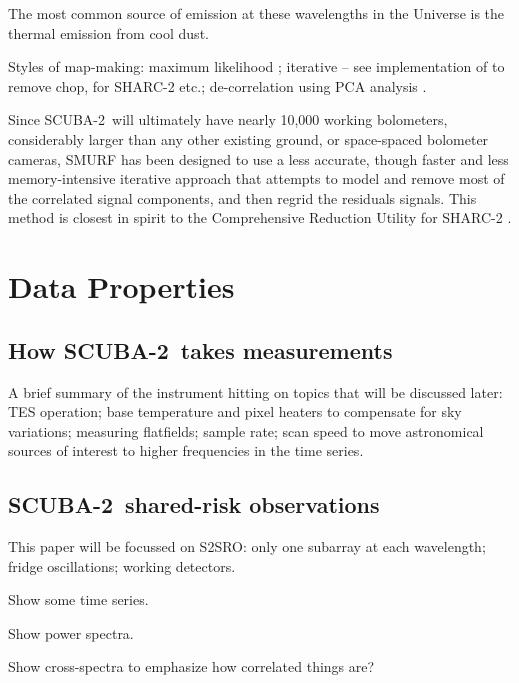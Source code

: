 \documentclass[useAMS,usenatbib,usegraphicx,nofootinbib]{mn2e}
\newcommand{\scuba}{SCUBA-2}
\begin{document}
The most common source of emission at these wavelengths in the
Universe is the thermal emission from cool dust.


Styles of map-making: maximum likelihood
\citep[e.g.,][]{patanchon2008}; iterative -- see \citet{johnstone2000}
implementation of \citet{wright1996} to remove chop,
\citet{kovacs2008} for SHARC-2 etc.; de-correlation using PCA
analysis \citep[e.g.][]{laurent2005,scott2008,aguirre2010}.

Since \scuba\ will ultimately have nearly 10,000 working bolometers,
considerably larger than any other existing ground, or space-spaced
bolometer cameras, SMURF has been designed to use a less accurate,
though faster and less memory-intensive iterative approach that
attempts to model and remove most of the correlated signal components,
and then regrid the residuals signals. This method is closest in
spirit to the Comprehensive Reduction Utility for SHARC-2
\citep[CRUSH,][]{kovacs2008}.


\section{Data Properties}
\label{sec:data}

\subsection{How \scuba\ takes measurements}

A brief summary of the instrument hitting on topics that will be
discussed later: TES operation; base temperature and pixel heaters to
compensate for sky variations; measuring flatfields; sample rate; scan
speed to move astronomical sources of interest to higher frequencies
in the time series.

\subsection{\scuba\ shared-risk observations}

This paper will be focussed on S2SRO: only one subarray at each
wavelength; fridge oscillations; working detectors.

Show some time series.

Show power spectra.

Show cross-spectra to emphasize how correlated things are?
\end{document}
